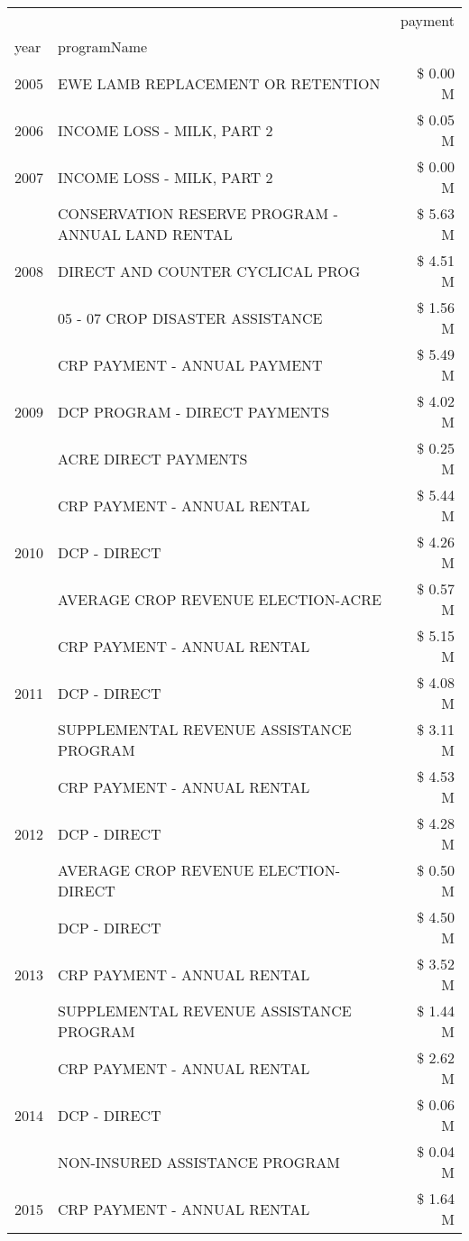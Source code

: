 \begin{tabular}{llr}
\toprule
 &  & payment \\
year & programName &  \\
\midrule
2005 & EWE LAMB REPLACEMENT OR RETENTION & \$ 0.00 M \\
\cline{1-3}
2006 & INCOME LOSS - MILK, PART 2 & \$ 0.05 M \\
\cline{1-3}
2007 & INCOME LOSS - MILK, PART 2 & \$ 0.00 M \\
\cline{1-3}
\multirow[t]{3}{*}{2008} & CONSERVATION RESERVE PROGRAM - ANNUAL LAND RENTAL & \$ 5.63 M \\
 & DIRECT AND COUNTER CYCLICAL PROG & \$ 4.51 M \\
 & 05 - 07 CROP DISASTER ASSISTANCE & \$ 1.56 M \\
\cline{1-3}
\multirow[t]{3}{*}{2009} & CRP PAYMENT - ANNUAL PAYMENT & \$ 5.49 M \\
 & DCP PROGRAM - DIRECT PAYMENTS & \$ 4.02 M \\
 & ACRE DIRECT PAYMENTS & \$ 0.25 M \\
\cline{1-3}
\multirow[t]{3}{*}{2010} & CRP PAYMENT - ANNUAL RENTAL & \$ 5.44 M \\
 & DCP - DIRECT & \$ 4.26 M \\
 & AVERAGE CROP REVENUE ELECTION-ACRE & \$ 0.57 M \\
\cline{1-3}
\multirow[t]{3}{*}{2011} & CRP PAYMENT - ANNUAL RENTAL & \$ 5.15 M \\
 & DCP - DIRECT & \$ 4.08 M \\
 & SUPPLEMENTAL REVENUE ASSISTANCE PROGRAM & \$ 3.11 M \\
\cline{1-3}
\multirow[t]{3}{*}{2012} & CRP PAYMENT - ANNUAL RENTAL & \$ 4.53 M \\
 & DCP - DIRECT & \$ 4.28 M \\
 & AVERAGE CROP REVENUE ELECTION-DIRECT & \$ 0.50 M \\
\cline{1-3}
\multirow[t]{3}{*}{2013} & DCP - DIRECT & \$ 4.50 M \\
 & CRP PAYMENT - ANNUAL RENTAL & \$ 3.52 M \\
 & SUPPLEMENTAL REVENUE ASSISTANCE PROGRAM & \$ 1.44 M \\
\cline{1-3}
\multirow[t]{3}{*}{2014} & CRP PAYMENT - ANNUAL RENTAL & \$ 2.62 M \\
 & DCP - DIRECT & \$ 0.06 M \\
 & NON-INSURED ASSISTANCE PROGRAM & \$ 0.04 M \\
\cline{1-3}
\multirow[t]{3}{*}{2015} & CRP PAYMENT - ANNUAL RENTAL & \$ 1.64 M \\

\end{tabular}
